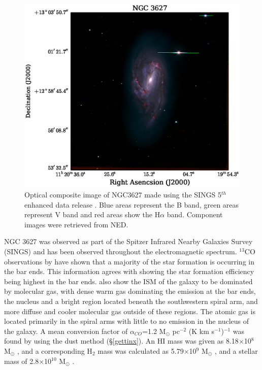 \begin{figure}
  \centering
  \includegraphics[width=1.\textwidth]{intro_imgs/rgb_tst.eps}
  \caption{Optical composite image of NGC3627 made using the SINGS 5$^{th}$ enhanced data release \citep{kennicutt2003}.  Blue areas represent the B band, green areas represent V band and red areas show the H$\alpha$ band.  Component images were retrieved from NED.}
  \label{fig:ngc3627_opt}
\end{figure}

NGC 3627 was observed as part of the Spitzer Infrared Nearby Galaxies Survey (SINGS) \citep{kennicutt2003} and has been observed throughout the electromagnetic spectrum.  $^{13}$CO observations by \cite{watanabe2011} have shown that a majority of the star formation is occurring in the bar ends.  This information agrees with \cite{warren2010} showing the star formation efficiency being highest in the bar ends.  \cite{warren2010} also show the ISM of the galaxy to be dominated by molecular gas, with dense warm gas dominating the emission at the bar ends, the nucleus and a bright region located beneath the southwestern spiral arm, and more diffuse and cooler molecular gas outside of these regions.  The atomic gas is located primarily in the spiral arms with little to no emission in the nucleus of the galaxy.  A mean conversion factor of $\alpha_{CO}$=1.2 M$_\odot$ pc$^{-2}$ (K km s$^{-1}$)$^{-1}$ was found by \cite{sandstrom2013} using the dust method (\S\ref{gettinx}).  An HI mass was given as 8.18$\times$10$^8$ M$_\odot$ \citep{walter2008}, and a corresponding H$_2$ mass was calculated as 5.79$\times$10$^9$ M$_\odot$ \citep{kennicutt2003}, and a stellar mass of 2.8$\times$10$^{10}$ M$_\odot$ \citep{skibba2011}.

